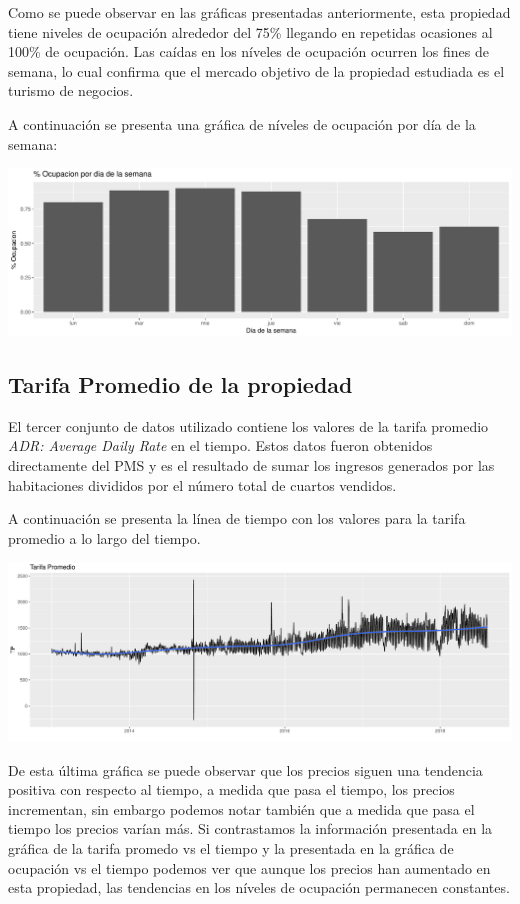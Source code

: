 Como se puede observar en las gráficas presentadas anteriormente, esta propiedad tiene niveles de ocupación alrededor del 75\% llegando en repetidas ocasiones al 100\% de ocupación. Las caídas en los níveles de ocupación ocurren los fines de semana, lo cual confirma que el mercado objetivo de la propiedad estudiada es el turismo de negocios.

A continuación se presenta una gráfica de níveles de ocupación por día de la semana:

\color{fgcolor}
\includegraphics[width=\maxwidth]{Figures/Ocupacion_Dia_Semana-1}


\subsection*{Tarifa Promedio de la propiedad}

El tercer conjunto de datos utilizado contiene los valores de la tarifa promedio \emph{ADR: Average Daily Rate} en el tiempo. Estos datos fueron obtenidos directamente del PMS y es el resultado de sumar los ingresos generados por las habitaciones divididos por el número total de cuartos vendidos. 

A continuación se presenta la línea de tiempo con los valores para la tarifa promedio a lo largo del tiempo.

\color{fgcolor}
\includegraphics[width=\maxwidth]{figures/IndicadoresTarifaPromedio-1} 

De esta última gráfica se puede observar que los precios siguen una tendencia positiva con respecto al tiempo, a medida que pasa el tiempo, los precios incrementan, sin embargo podemos notar también que a medida que pasa el tiempo los precios varían más. Si contrastamos la información presentada en la gráfica de la tarifa promedo vs el tiempo y la presentada en la gráfica de ocupación vs el tiempo podemos ver que aunque los precios han aumentado en esta propiedad, las tendencias en los níveles de ocupación permanecen constantes.

